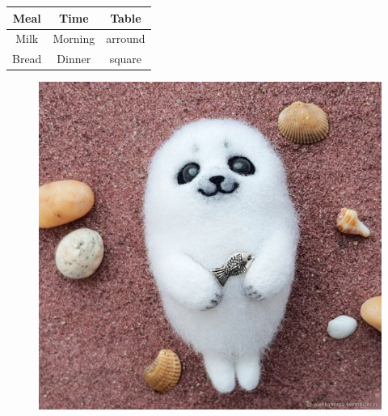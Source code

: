 \documentclass{article}
\begin{document}
\begin{table}
\begin{tabular}{|c|c|c|}
\hline
Meal &    Time &    Table\\
\hline
Milk &    Morning &    arround\\
Bread &    Dinner &    square\\
\hline
\end{tabular}
\end{table}

\begin{figure}
\centering
\includegraphics[width=0.5\linewidth]{nerpa.jpg}
\end{figure}
\end{document}
